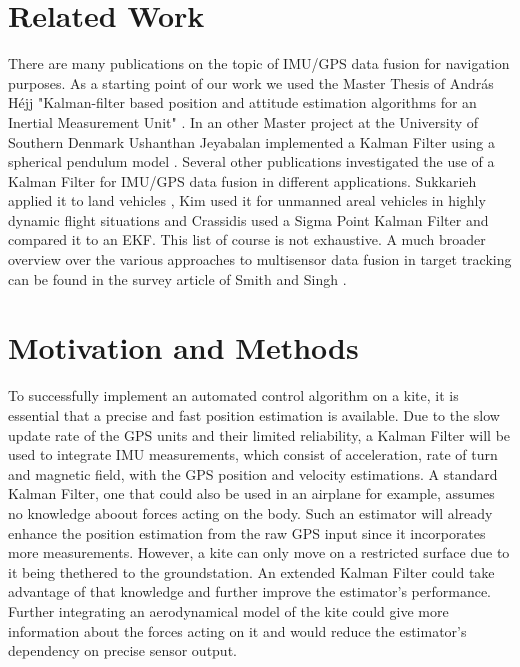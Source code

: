 \section{Related Work}
There are many publications on the topic of IMU/GPS data fusion for navigation purposes. As a starting point of our work we used the Master Thesis of Andr\'{a}s H\'{e}jj "Kalman-filter based position and attitude estimation algorithms for an Inertial Measurement Unit" \cite{hejj}. In an other Master project at the University of Southern Denmark Ushanthan Jeyabalan implemented a Kalman Filter using a spherical pendulum model \cite{ushanthan}.
Several other publications investigated the use of a Kalman Filter for IMU/GPS data fusion in different applications. Sukkarieh applied it to land vehicles \cite{sukkarieh1999}, Kim used it for unmanned areal vehicles in highly dynamic flight situations \cite{kim2006} and Crassidis used a Sigma Point Kalman Filter and compared it to an EKF. This list of course is not exhaustive. A much broader overview over the various approaches to multisensor data fusion in target tracking can be found in the survey article of Smith and Singh \cite{smith2006}.
 


\section{Motivation and Methods}
To successfully implement an automated control algorithm on a kite, it is essential that a precise and fast position estimation is available. Due to the slow update rate of the GPS units and their limited reliability, a Kalman Filter will be used to integrate IMU measurements, which consist of acceleration, rate of turn and magnetic field, with the GPS position and velocity estimations. A standard Kalman Filter, one that could also be used in an airplane for example, assumes no knowledge aboout forces acting on the body. Such an estimator will already enhance the position estimation from the raw GPS input since it incorporates more measurements.  However, a kite can only move on a restricted surface due to it being thethered to the groundstation. An extended Kalman Filter could take advantage of that knowledge and further improve the estimator's performance. Further integrating an aerodynamical model of the kite could give more information about the forces acting on it and would reduce the estimator's dependency on precise sensor output.  

